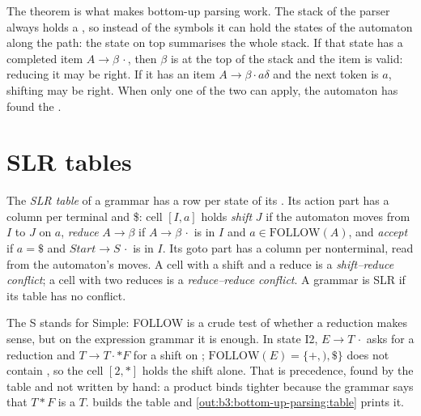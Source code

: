 The theorem is what makes bottom-up parsing work. The stack of the parser always holds a , so instead of the symbols it can hold the states of the automaton along the path: the state on top summarises the whole stack. If that state has a completed item $A \to \beta\,\cdot$, then $\beta$ is at the top of the stack and the item is valid: reducing it may be right. If it has an item $A \to \beta \cdot a \delta$ and the next token is $a$, shifting may be right. When only one of the two can apply, the automaton has found the .

\section{SLR tables}\label{sec:b3:bottom-up-parsing:slr}

\begin{definition}\label{def:b3:bottom-up-parsing:slr}
The \emph{SLR table} of a grammar has a row per state of its . Its action part has a column per terminal and \$: cell $[I, a]$ holds \emph{shift} $J$ if the automaton moves from $I$ to $J$ on $a$, \emph{reduce} $A \to \beta$ if $A \to \beta\,\cdot$ is in $I$ and $a \in \mathrm{FOLLOW}(A)$, and \emph{accept} if $a = \$$ and $\mathit{Start} \to S\,\cdot$ is in $I$. Its goto part has a column per nonterminal, read from the automaton's moves. A cell with a shift and a reduce is a \emph{shift--reduce conflict}; a cell with two reduces is a \emph{reduce--reduce conflict}. A grammar is SLR if its table has no conflict.
\end{definition}

The S stands for Simple: FOLLOW is a crude test of whether a reduction makes sense, but on the expression grammar it is enough. In state I2, $E \to T\,\cdot$ asks for a reduction and $T \to T \cdot * F$ for a shift on \code{*}; $\mathrm{FOLLOW}(E) = \{+, ), \$\}$ does not contain \code{*}, so the cell $[2, *]$ holds the shift alone. That is precedence, found by the table and not written by hand: a product binds tighter because the grammar says that $T * F$ is a $T$.  builds the table and \cref{out:b3:bottom-up-parsing:table} prints it.

\label{lst:b3:bottom-up-parsing:table}

